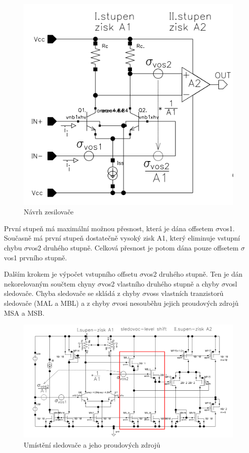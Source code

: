 \begin{figure}[h]
   \begin{center}
     \includegraphics[scale=0.5]{images/OZ.png}
   \end{center}
   \caption{Návrh zesilovače}
\end{figure}

První stupeň má maximální možnou přesnost, která je dána offsetem $\sigma$vos1. Současně má první stupeň dostatečně vysoký zisk A1, který eliminuje vstupní chybu $\sigma$vos2 druhého stupně. Celková přesnost je potom dána pouze offsetem $\sigma$vos1 prvního stupně.

Dalším krokem je výpočet vstupního offsetu $\sigma$vos2 druhého stupně. Ten je dán nekorelovaným součtem chyny $\sigma$vos2 vlastního druhého stupně a chyby $\sigma$vosl sledovače. Chyba sledovače se skládá z chyby $\sigma$voss vlastních tranzistorů sledovače (MAL a MBL) a z chyby $\sigma$vosi nesouběhu jejich proudových zdrojů MSA a MSB.

\begin{figure}[h]
   \begin{center}
     \includegraphics[scale=0.5]{images/sled.png}
   \end{center}
   \caption{Umístění sledovače a jeho proudových zdrojů}
\end{figure}

